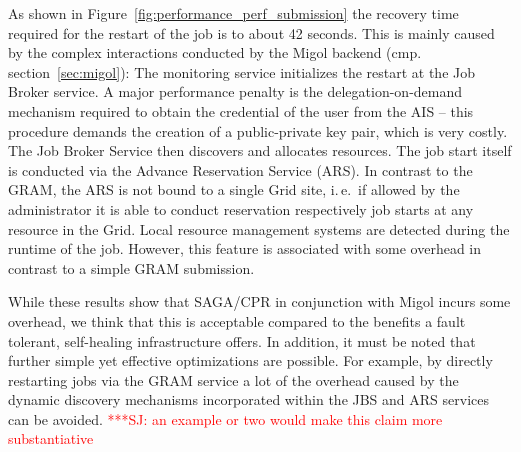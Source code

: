\documentclass[times, 10pt, twocolumn]{article}
\newcommand{\jhanote}[1]{ {\textcolor{red} { ***SJ: #1 }}}
\newcommand{\jhanote}[1]{}
\begin{document}
As shown in Figure~\ref{fig:performance_perf_submission} the recovery
time required for the restart of the job is to about 42 seconds. This
is mainly caused by the complex interactions conducted by the Migol
backend (cmp. section~\ref{sec:migol}): The monitoring service
initializes the restart at the Job Broker service.  A major
performance penalty is the delegation-on-demand mechanism required to
obtain the credential of the user from the AIS -- this procedure
demands the creation of a public-private key pair, which is very
costly. The Job Broker Service then discovers and allocates resources.
The job start itself is conducted via the Advance Reservation Service
(ARS). In contrast to the GRAM, the ARS is not bound to a single Grid
site, i.\,e.\ if allowed by the administrator it is able to conduct
reservation respectively job starts at any resource in the Grid. Local
resource management systems are detected during the runtime of the
job. However, this feature is associated with some overhead in
contrast to a simple GRAM submission.



While these results show that SAGA/CPR in conjunction with Migol
incurs some overhead, we think that this is acceptable compared to the
benefits a fault tolerant, self-healing infrastructure offers. In
addition, it must be noted that further simple yet effective
optimizations are possible. For example, by directly restarting jobs
via the GRAM service a lot of the overhead caused by the dynamic
discovery mechanisms incorporated within the JBS and ARS services can
be avoided.  \jhanote{an example or two would make this claim more
  substantiative}
\end{document}
